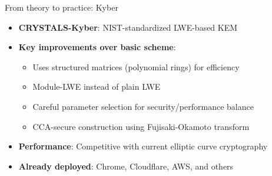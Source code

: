 \documentclass[aspectratio=169, lualatex, handout]{beamer}
\begin{document}
\begin{frame}{From theory to practice: Kyber}
	\begin{itemize}
		\item \textbf{CRYSTALS-Kyber}: NIST-standardized LWE-based KEM
		\item \textbf{Key improvements over basic scheme}:
		      \begin{itemize}
			      \item Uses structured matrices (polynomial rings) for efficiency
			      \item Module-LWE instead of plain LWE
			      \item Careful parameter selection for security/performance balance
			      \item CCA-secure construction using Fujisaki-Okamoto transform
		      \end{itemize}
		\item \textbf{Performance}: Competitive with current elliptic curve cryptography
		\item \textbf{Already deployed}: Chrome, Cloudflare, AWS, and others
	\end{itemize}
\end{frame}
\end{document}
